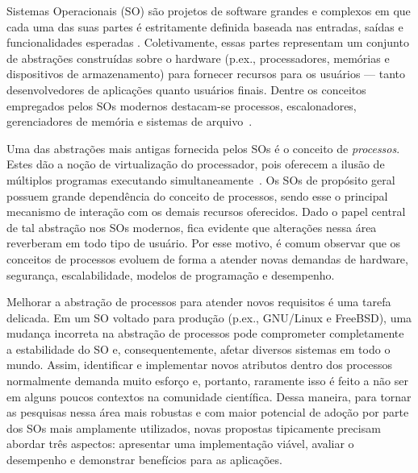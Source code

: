 \label{cap:introducao}

Sistemas Operacionais (SO) são projetos de software grandes e
complexos em que cada uma das suas partes é estritamente definida baseada nas
entradas, saídas e funcionalidades esperadas \citep{silberschatz}.
Coletivamente, essas partes representam um conjunto de abstrações construídas
sobre o hardware (p.ex., processadores, memórias e dispositivos de
armazenamento) para fornecer recursos para os usuários --- tanto
desenvolvedores de aplicações quanto usuários finais. Dentre os conceitos
empregados pelos SOs modernos destacam-se processos, escalonadores,
gerenciadores de memória e sistemas de arquivo~\citep{tanenbaum}.

Uma das abstrações mais antigas fornecida pelos SOs é o conceito de
\textit{processos}. Estes dão a noção de virtualização do processador, pois
oferecem a ilusão de múltiplos programas executando
simultaneamente~\citep{love, tanenbaum}. Os SOs de propósito geral possuem
grande dependência do conceito de processos, sendo esse o principal
mecanismo de interação com os demais recursos oferecidos. Dado o papel central
de tal abstração nos SOs modernos, fica evidente que alterações nessa área
reverberam em todo tipo de usuário. Por esse motivo, é comum observar que os
conceitos de processos evoluem de forma a atender novas demandas de hardware,
segurança, escalabilidade, modelos de programação e desempenho.

Melhorar a abstração de processos para atender novos requisitos é
uma tarefa delicada. Em um SO voltado para produção (p.ex., GNU/Linux e
FreeBSD), uma mudança incorreta na abstração de processos pode comprometer
completamente a estabilidade do SO e, consequentemente, afetar diversos sistemas em
todo o mundo. Assim, identificar e implementar novos atributos dentro dos
processos normalmente demanda muito esforço e, portanto, raramente isso é feito a não ser em alguns poucos contextos na comunidade científica. Dessa
maneira, para tornar as pesquisas nessa área mais robustas e com maior
potencial de adoção por parte dos SOs mais amplamente utilizados, novas propostas tipicamente
precisam abordar três aspectos: apresentar uma implementação viável,
avaliar o desempenho e demonstrar benefícios para as aplicações.


